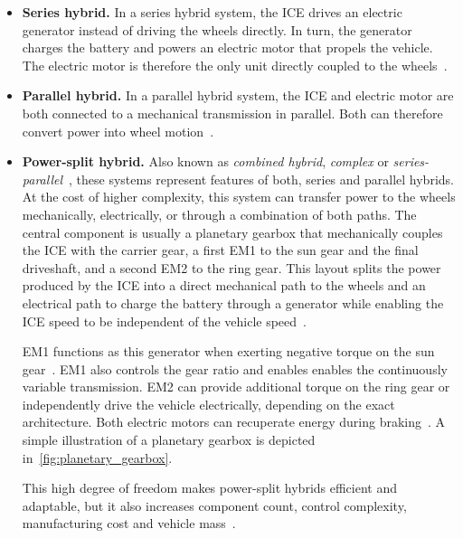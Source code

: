 \begin{itemize}
  \item \textbf{Series hybrid.} In a series hybrid system, the \ac{ICE} drives an electric generator instead of driving the wheels directly. In turn, the generator charges the battery and powers an electric motor that propels the vehicle. The electric motor is therefore the only unit directly coupled to the wheels~\cite{chan_electric_2010, enang_modelling_2017}.
  \item \textbf{Parallel hybrid.} In a parallel hybrid system, the \ac{ICE} and electric motor are both connected to a mechanical transmission in parallel. Both can therefore convert power into wheel motion~\cite{enang_modelling_2017}.
  \item \textbf{Power-split hybrid.} Also known as \emph{combined hybrid}, \emph{complex} or \emph{series-parallel}~\cite{kebriaei_hybrid_2015, enang_modelling_2017, chan_electric_2010}, these systems represent features of both, series and parallel hybrids. At the cost of higher complexity, this system can transfer power to the wheels mechanically, electrically, or through a combination of both paths. The central component is usually a planetary gearbox that mechanically couples the \ac{ICE} with the carrier gear, a first \ac{EM1} to the sun gear and the final driveshaft, and a second \ac{EM2} to the ring gear. This layout splits the power produced by the \ac{ICE} into a direct mechanical path to the wheels and an electrical path to charge the battery through a generator while enabling the \ac{ICE} speed to be independent of the vehicle speed~\cite{frey_data-based_2025}.

    \ac{EM1} functions as this generator when exerting negative torque on the sun gear~\cite{zhang_design_2015}. \ac{EM1} also controls the gear ratio and enables enables the continuously variable transmission. \ac{EM2} can provide additional torque on the ring gear or independently drive the vehicle electrically, depending on the exact architecture. Both electric motors can recuperate energy during braking~\cite{frey_data-based_2025}. A simple illustration of a planetary gearbox is depicted in~\autoref{fig:planetary_gearbox}.

    This high degree of freedom makes power-split hybrids efficient and adaptable, but it also increases component count, control complexity, manufacturing cost and vehicle mass~\cite{hofmann_hybridfahrzeuge_2023, frey_data-based_2025}.
\end{itemize}

